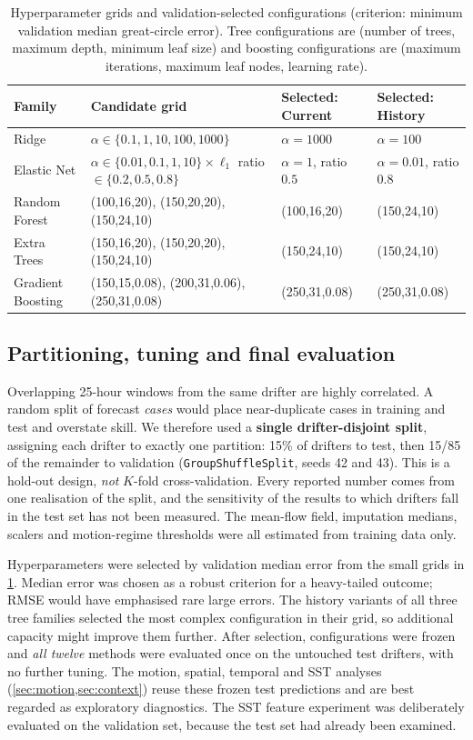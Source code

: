 \begin{table}[!htbp]
\centering
\caption{Hyperparameter grids and validation-selected configurations (criterion: minimum validation median great-circle error). Tree configurations are (number of trees, maximum depth, minimum leaf size) and boosting configurations are (maximum iterations, maximum leaf nodes, learning rate).}
\label{tab:tuning}
\small
\begin{tabularx}{\textwidth}{@{}l>{\raggedright\arraybackslash}Xll@{}}
\toprule
Family & Candidate grid & Selected: Current & Selected: History \\
\midrule
Ridge & $\alpha\in\{0.1,1,10,100,1000\}$ & $\alpha=1000$ & $\alpha=100$ \\
Elastic Net & $\alpha\in\{0.01,0.1,1,10\}\times\ell_1$ ratio $\in\{0.2,0.5,0.8\}$ & $\alpha=1$, ratio $0.5$ & $\alpha=0.01$, ratio $0.8$ \\
Random Forest & (100,16,20), (150,20,20), (150,24,10) & (100,16,20) & (150,24,10) \\
Extra Trees & (150,16,20), (150,20,20), (150,24,10) & (150,24,10) & (150,24,10) \\
Gradient Boosting & (150,15,0.08), (200,31,0.06), (250,31,0.08) & (250,31,0.08) & (250,31,0.08) \\
\bottomrule
\end{tabularx}
\end{table}

\subsection{Partitioning, tuning and final evaluation}
Overlapping 25-hour windows from the same drifter are highly correlated. A random split of forecast \emph{cases} would place near-duplicate cases in training and test and overstate skill. We therefore used a \textbf{single drifter-disjoint split}, assigning each drifter to exactly one partition: 15\% of drifters to test, then 15/85 of the remainder to validation (\texttt{GroupShuffleSplit}, seeds 42 and 43). This is a hold-out design, \emph{not} $K$-fold cross-validation. Every reported number comes from one realisation of the split, and the sensitivity of the results to which drifters fall in the test set has not been measured. The mean-flow field, imputation medians, scalers and motion-regime thresholds were all estimated from training data only.

Hyperparameters were selected by validation median error from the small grids in \cref{tab:tuning}. Median error was chosen as a robust criterion for a heavy-tailed outcome; RMSE would have emphasised rare large errors. The history variants of all three tree families selected the most complex configuration in their grid, so additional capacity might improve them further. After selection, configurations were frozen and \emph{all twelve} methods were evaluated once on the untouched test drifters, with no further tuning. The motion, spatial, temporal and SST analyses (\cref{sec:motion,sec:context}) reuse these frozen test predictions and are best regarded as exploratory diagnostics. The SST feature experiment was deliberately evaluated on the validation set, because the test set had already been examined.

